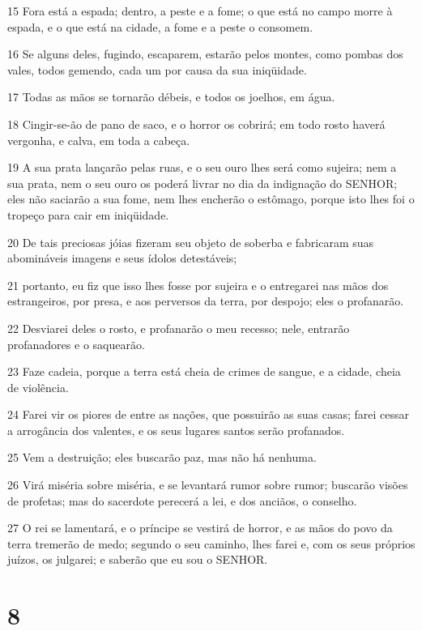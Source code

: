 \par 15 Fora está a espada; dentro, a peste e a fome; o que está no campo morre à espada, e o que está na cidade, a fome e a peste o consomem.
\par 16 Se alguns deles, fugindo, escaparem, estarão pelos montes, como pombas dos vales, todos gemendo, cada um por causa da sua iniqüidade.
\par 17 Todas as mãos se tornarão débeis, e todos os joelhos, em água.
\par 18 Cingir-se-ão de pano de saco, e o horror os cobrirá; em todo rosto haverá vergonha, e calva, em toda a cabeça.
\par 19 A sua prata lançarão pelas ruas, e o seu ouro lhes será como sujeira; nem a sua prata, nem o seu ouro os poderá livrar no dia da indignação do SENHOR; eles não saciarão a sua fome, nem lhes encherão o estômago, porque isto lhes foi o tropeço para cair em iniqüidade.
\par 20 De tais preciosas jóias fizeram seu objeto de soberba e fabricaram suas abomináveis imagens e seus ídolos detestáveis;
\par 21 portanto, eu fiz que isso lhes fosse por sujeira e o entregarei nas mãos dos estrangeiros, por presa, e aos perversos da terra, por despojo; eles o profanarão.
\par 22 Desviarei deles o rosto, e profanarão o meu recesso; nele, entrarão profanadores e o saquearão.
\par 23 Faze cadeia, porque a terra está cheia de crimes de sangue, e a cidade, cheia de violência.
\par 24 Farei vir os piores de entre as nações, que possuirão as suas casas; farei cessar a arrogância dos valentes, e os seus lugares santos serão profanados.
\par 25 Vem a destruição; eles buscarão paz, mas não há nenhuma.
\par 26 Virá miséria sobre miséria, e se levantará rumor sobre rumor; buscarão visões de profetas; mas do sacerdote perecerá a lei, e dos anciãos, o conselho.
\par 27 O rei se lamentará, e o príncipe se vestirá de horror, e as mãos do povo da terra tremerão de medo; segundo o seu caminho, lhes farei e, com os seus próprios juízos, os julgarei; e saberão que eu sou o SENHOR.

\chapter{8}

